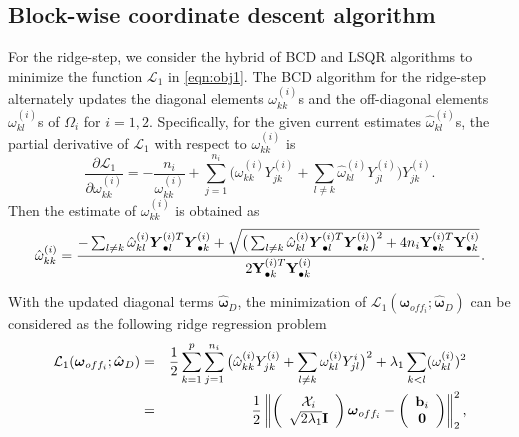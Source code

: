 \documentclass[useAMS,usenatbib,referee]{bio}
\newcommand{\bs}{\boldsymbol}
\begin{document}
{\subsection{Block-wise coordinate descent algorithm}

For the ridge-step, we consider the hybrid of BCD and LSQR algorithms to minimize the function ${\mathcal L}_1$ in \eqref{eqn:obj1}.
The BCD algorithm for the ridge-step alternately updates the diagonal elements ${\omega}^{(i)}_{kk}$s and the off-diagonal elements ${\omega}^{(i)}_{kl}$s of $\Omega_i$ for $i=1,2$.
Specifically, for the given current estimates $\hat{\omega}^{(i)}_{kl}$s, the partial derivative of ${\mathcal L}_1$ with respect to ${\omega}^{(i)}_{kk}$ is
\begin{equation} \label{eqn:pd_diag} \nonumber
\frac{\partial {\mathcal L}_1}{\partial \omega^{(i)}_{kk}}
= -\frac{n_i}{\omega^{(i)}_{kk}} 
+ \sum_{j=1}^{n_i}\big( \omega_{kk}^{(i)} Y^{(i)}_{jk}  + \sum_{l \neq k}  \hat{\omega}^{(i)}_{kl} {Y}_{jl}^{(i)} \big) {Y}_{jk}^{(i)}  .
\end{equation}
Then the estimate of ${\omega}^{(i)}_{kk}$ is obtained as
\begin{equation} \label{eqn:diag} \nonumber
\hat{\omega}^{(i)}_{kk} = 
\frac{ - \sum_{l \neq k} \hat{\omega}_{kl}^{(i)} \bs{Y}_{\bullet l}^{(i) T} \bs{Y}_{\bullet k}^{(i)} + 
\sqrt{\big(\sum_{l \neq k} \hat{\omega}_{kl}^{(i)} \bs{Y}_{\bullet l}^{(i) T} \bs{Y}_{\bullet k}^{(i)} \big)^2 +  4n_i {\bf Y}_{\bullet k}^{(i) T} {\bf Y}_{\bullet k}^{(i)}}}{2 {\bf Y}_{\bullet k}^{(i)T} {\bf Y}_{\bullet k}^{(i)}}. 
\end{equation}


With the updated diagonal terms $\hat{\bs{\omega}}_D$, the minimization of ${\mathcal L}_1(\bs{\omega}_{off_i};\hat{\bs{\omega}}_D)$ can be considered as the following ridge regression problem
\begin{eqnarray} \label{obj:ridge}
{\mathcal L}_1(\bs{\omega}_{off_i};\hat{\bs{\omega}}_D) &=&
\displaystyle \frac{1}{2} \sum_{k=1}^p \sum_{j=1}^{n_i}
\big(\hat{\omega}^{(i)}_{kk} Y_{jk}^{(i)} + \sum_{l\neq k} \omega^{(i)}_{kl} Y_{jl}^i
\big)^2 + \lambda_1 \sum_{k<l} (\omega^{(i)}_{kl})^2\\ \label{eqn:lsqr}
&=& \displaystyle
\frac{1}{2}
\left\|  
\begin{pmatrix}
\begin{array}{c}
{\mathcal X}_i\\
\sqrt{2\lambda_1} {\bf I}
\end{array}
\end{pmatrix}
\bs{\omega}_{off_i} - 
\begin{pmatrix}
\begin{array}{c}
{\bf b}_i\\
{\bf 0}
\end{array}
\end{pmatrix}
\right\|_2^2,
\end{eqnarray}

}
\end{document}
